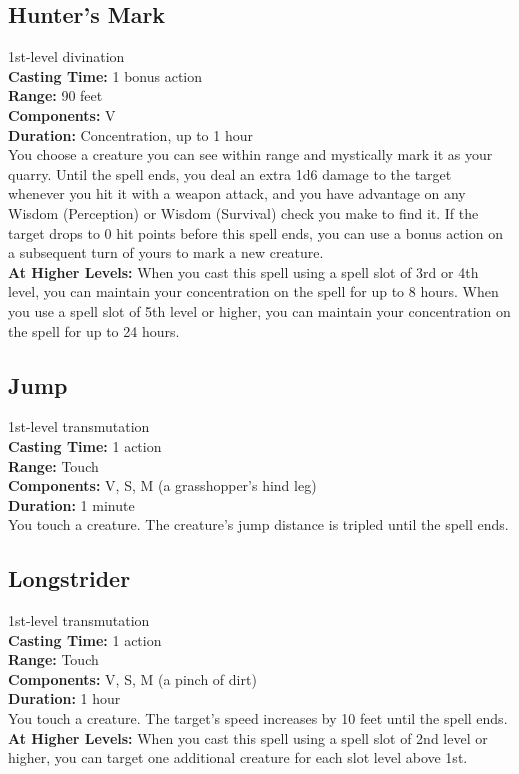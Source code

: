 \documentclass[11pt, A4paper, english]{article}
\begin{document}
		\subsection{Hunter's Mark}
1st-level divination \\
\textbf{Casting Time:} 1 bonus action \\
\textbf{Range:} 90 feet \\
\textbf{Components:} V \\
\textbf{Duration:} Concentration, up to 1 hour \\
You choose a creature you can see within range and mystically mark it as your quarry. Until the spell ends, you deal an extra 1d6 damage to the target whenever you hit it with a weapon attack, and you have advantage on any Wisdom (Perception) or Wisdom (Survival) check you make to find it. If the target drops to 0 hit points before this spell ends, you can use a bonus action on a subsequent turn of yours to mark a new creature. \\
\textbf{At Higher Levels:} When you cast this spell using a spell slot of 3rd or 4th level, you can maintain your concentration on the spell for up to 8 hours. When you use a spell slot of 5th level or higher, you can maintain your concentration on the spell for up to 24 hours.

		\subsection{Jump}
1st-level transmutation \\
\textbf{Casting Time:} 1 action \\
\textbf{Range:} Touch \\
\textbf{Components:} V, S, M (a grasshopper’s hind leg) \\
\textbf{Duration:} 1 minute \\
You touch a creature. The creature’s jump distance is tripled until the spell ends.

		\subsection{Longstrider}
1st-level transmutation \\
\textbf{Casting Time:} 1 action \\
\textbf{Range:} Touch \\
\textbf{Components:} V, S, M (a pinch of dirt) \\
\textbf{Duration:} 1 hour \\
You touch a creature. The target’s speed increases by 10 feet until the spell ends. \\
\textbf{At Higher Levels:} When you cast this spell using a spell slot of 2nd level or higher, you can target one additional creature for each slot level above 1st.
\end{document}

